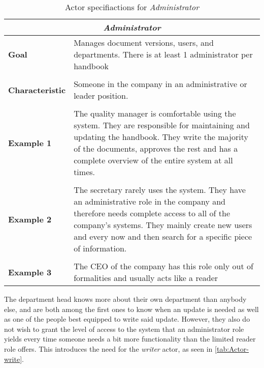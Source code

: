 \begin{table}[H]
	\begin{tabular}{l p{11.3cm}}
		\hline
		\multicolumn{2}{c}{\textbf{\textit{Administrator}}}\\
		\hline
		
		\textbf{Goal} &  Manages document versions, users, and departments. There is at least 1 administrator per handbook\\
		 &  \\
		 
		\textbf{Characteristic} & Someone in the company in an administrative or leader position.\\
		&  \\
		
		\textbf{Example 1}
		& The quality manager is comfortable using the system. 
		They are responsible for maintaining and updating the handbook.
		They write the majority of the documents, approves the rest and has a complete overview of the entire system at all times. \\
		&  \\
		
		\textbf{Example 2}
		& The secretary rarely uses the system.
		They have an administrative role in the company and therefore needs complete access to all of the company's systems.
		They mainly create new users and every now and then search for a specific piece of information.\\
		&  \\
		
		\textbf{Example 3}
		& The CEO of the company has this role only out of formalities and usually acts like a reader\\
		
		\hline
	\end{tabular}
\caption{Actor specifiactions for \textit{Administrator}}\label{tab:Actor-admin}
\end{table}

The department head knows more about their own department than anybody else, and are both among the first ones to know when an update is needed as well as one of the people best equipped to write said update.
However, they also do not wish to grant the level of access to the system that an administrator role yields every time someone needs a bit more functionality than the limited reader role offers.
This introduces the need for the \textit{writer} actor, as seen in \cref{tab:Actor-write}.

